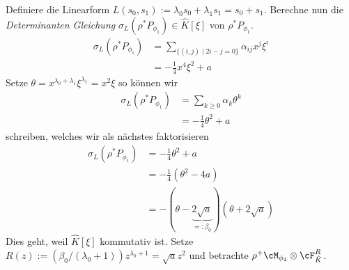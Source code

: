 Definiere die Linearform $L(s_0,s_1):=\lambda_0s_0+\lambda_1s_1=s_0+s_1$.
Berechne nun die \emph{Determinanten Gleichung} $\sigma_L(\rho^*P_{\phi_1})\in
\hat K[\xi]$ von $\rho^*P_{\phi_1}$.
\begin{align*}
\sigma_L(\rho^*P_{\phi_1})
  &= \sum_{\{(i,j)\mid 2i-j=0\}}\alpha_{ij}x^{j}\xi^i\\
  &= -\frac{1}{4}x^4\xi^2 + a
\end{align*}
Setze $\theta=x^{\lambda_0+\lambda_1}\xi^{\lambda_1}=x^2\xi$ so können wir
\begin{align*}
\sigma_L(\rho^*P_{\phi_1}) &= \sum_{k\geq 0}\alpha_k\theta^k\\
  &= -\frac{1}{4}\theta^2 + a
\end{align*}
schreiben, welches wir als nächstes faktorisieren
\begin{align*}
\sigma_L(\rho^*P_{\phi_1}) &= -\frac{1}{4}\theta^2+a\\
  &=-\frac{1}{4}(\theta^2-4a)\\
  &=-(\theta-\underset{=:\beta_0}{\underbrace{2\sqrt{a}}})(\theta+2\sqrt{a})
\end{align*}
Dies geht, weil $\hat K[\xi]$ kommutativ ist.
Setze $R(z):=(\beta_0/(\lambda_0+1))z^{\lambda_0+1}=\sqrt{a}z^2$ und betrachte
$\rho^+\cM_{\phi_1}\otimes\cF_{\hat K}^R$.
\begin{comment}
BIS HIER HIN KORREGIERT: $P_\phi$ ist im folgendem FALSCH
\end{comment}

